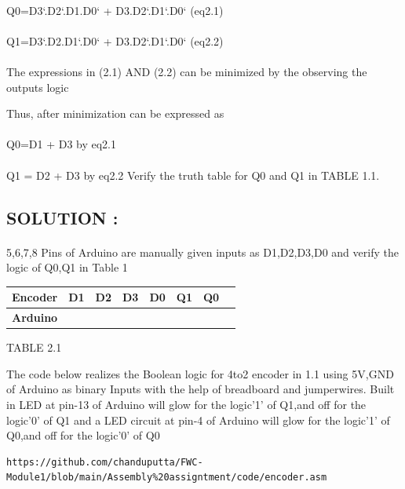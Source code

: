 \documentclass[10pt, a4paper]{article}
\begin{document}
\paragraph{}
{Q0=D3`.D2`.D1.D0` + D3.D2`.D1`.D0`                 (eq2.1)}
\paragraph{}
{Q1=D3`.D2.D1`.D0` + D3.D2`.D1`.D0`                          (eq2.2)}
 
 \paragraph{}
The expressions in (2.1) AND (2.2) can be minimized by the observing the outputs logic

Thus, after minimization  can
be expressed as
\paragraph{}
Q0=D1 + D3    by eq2.1
\paragraph{}  
Q1 = D2 + D3  by eq2.2
\hfill \break
Verify the truth table for Q0 and Q1 in TABLE 1.1.
\hfill \break

\subsection{SOLUTION :}

\paragraph{}
5,6,7,8 Pins of Arduino are manually given inputs as D1,D2,D3,D0 and verify the logic of Q0,Q1 in Table 1

\begin{tabularx}{0.60\textwidth} { 
  | >{\centering\arraybackslash}X 
  | >{\centering\arraybackslash}X 
  | >{\centering\arraybackslash}X 
  | >{\centering\arraybackslash}X 
  | >{\centering\arraybackslash}X 
  | >{\centering\arraybackslash}X
  | >{\centering\arraybackslash}X
  | >{\centering\arraybackslash}X|}

\hline
 \textbf{Encoder} & D1 & D2 & D3 & D0 & Q1 & Q0 \\
\hline
\textbf{Arduino} & 5 & 6 & 7 & 8 & 13 & 4 \\  
\hline
\end{tabularx}
 
\begin{center}
TABLE 2.1
\end{center}

The code below realizes the Boolean logic for 4to2 encoder in 1.1  using 5V,GND of Arduino as binary Inputs with the help of breadboard and jumperwires.
Built in LED at pin-13 of Arduino will glow for the logic'1' of Q1,and off for the logic'0' of Q1  and a LED circuit at pin-4 of Arduino will glow for the logic'1' of Q0,and off for the logic'0' of Q0
\begin{lstlisting}
https://github.com/chanduputta/FWC-Module1/blob/main/Assembly%20assigntment/code/encoder.asm
\end{lstlisting}

\end{document}
